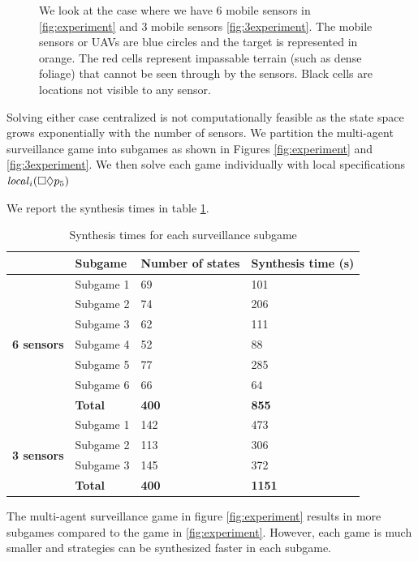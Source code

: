 \begin{figure}
{\hspace{.3cm}}

\caption{We look at the case where we have 6 mobile sensors in \ref{fig:experiment} and 3 mobile sensors \ref{fig:3experiment}\label{fig:bigexp}. The mobile sensors or UAVs are blue circles and the target is represented in orange. The red cells represent impassable terrain (such as dense foliage) that cannot be seen through by the sensors. Black cells are locations not visible to any sensor.}\vspace{-0.5cm}
\end{figure} 

Solving either case centralized is not computationally feasible as the state space grows exponentially with the number of sensors. We partition the multi-agent surveillance game into subgames as shown in Figures \ref{fig:experiment} and \ref{fig:3experiment}. We then solve each game individually with local specifications $\mathit{local}_i(\square \lozenge p_5)$

We report the synthesis times in table \ref{tab:synthtime}.

\begin{table}[h!]
	\centering
	\caption{Synthesis times for each surveillance subgame}
	\label{tab:synthtime}
	\begin{tabular}{c|l|l|l}
		\multicolumn{1}{l|}{}                                    & \textbf{Subgame} & \textbf{Number of states} & \textbf{Synthesis time (s)} \\ \hline \hline
		\multirow{7}{*}{\textbf{6 sensors}}
		& Subgame 1   & 69     & 101                          \\
	    & Subgame 2   & 74     & 206                          \\
		& Subgame 3   & 62     & 111                          \\
		& Subgame 4   & 52     & 88                          \\
		& Subgame 5   & 77     & 285                          \\
		& Subgame 6   & 66     & 64                          \\ \hline
		& \textbf{Total}   & \textbf{400}         & \textbf{855}                         \\ \hline
		\multicolumn{1}{l|}{\multirow{4}{*}{\textbf{3 sensors}}} & Subgame 1        & 142 & 473                         \\
		\multicolumn{1}{l|}{}                                    & Subgame 2        & 113 & 306                         \\
		\multicolumn{1}{l|}{}                                    & Subgame 3        & 145 & 372                         \\ \hline
		\multicolumn{1}{l|}{}                                    &  \textbf{Total} & \textbf{400}            & \textbf{1151}                        
	\end{tabular}
\end{table}

The multi-agent surveillance game in figure \ref{fig:experiment} results in more subgames compared to the game in \ref{fig:experiment}. However, each game is much smaller and strategies can be synthesized faster in each subgame. 